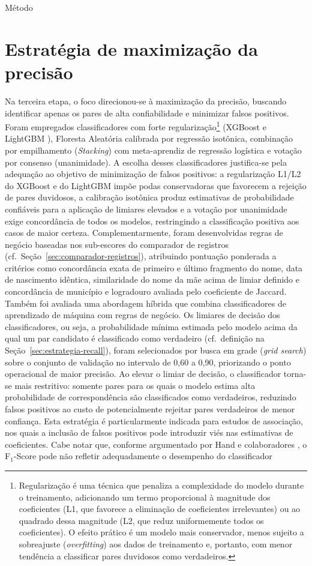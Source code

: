 \begin{chapter}{Método}
\section{Estratégia de maximização da precisão}\label{sec:estrategia-precisao}

Na terceira etapa, o foco direcionou-se à maximização da precisão, buscando identificar apenas os pares de alta confiabilidade e minimizar falsos positivos. Foram empregados classificadores com forte regularização\footnote{Regularização é uma técnica que penaliza a complexidade do modelo durante o treinamento, adicionando um termo proporcional à magnitude dos coeficientes (L1, que favorece a eliminação de coeficientes irrelevantes) ou ao quadrado dessa magnitude (L2, que reduz uniformemente todos os coeficientes). O efeito prático é um modelo mais conservador, menos sujeito a sobreajuste (\textit{overfitting}) aos dados de treinamento e, portanto, com menor tendência a classificar pares duvidosos como verdadeiros.} (XGBoost \cite{Chen2016xgboost} e LightGBM \cite{Ke2017lightgbm}), Floresta Aleatória calibrada por regressão isotônica, combinação por empilhamento (\textit{Stacking}) com meta-aprendiz de regressão logística e votação por consenso (unanimidade). A escolha desses classificadores justifica-se pela adequação ao objetivo de minimização de falsos positivos: a regularização L1/L2 do XGBoost e do LightGBM impõe podas conservadoras que favorecem a rejeição de pares duvidosos, a calibração isotônica produz estimativas de probabilidade confiáveis para a aplicação de limiares elevados e a votação por unanimidade exige concordância de todos os modelos, restringindo a classificação positiva aos casos de maior certeza. Complementarmente, foram desenvolvidas regras de negócio baseadas nos sub-escores do comparador de registros (cf.\ Seção~\ref{sec:comparador-registros}), atribuindo pontuação ponderada a critérios como concordância exata de primeiro e último fragmento do nome, data de nascimento idêntica, similaridade do nome da mãe acima de limiar definido e concordância de município e logradouro avaliada pelo coeficiente de Jaccard. Também foi avaliada uma abordagem híbrida que combina classificadores de aprendizado de máquina com regras de negócio. Os limiares de decisão dos classificadores, ou seja, a probabilidade mínima estimada pelo modelo acima da qual um par candidato é classificado como verdadeiro (cf.\ definição na Seção~\ref{sec:estrategia-recall}), foram selecionados por busca em grade (\textit{grid search}) sobre o conjunto de validação no intervalo de 0{,}60 a 0{,}90, priorizando o ponto operacional de maior precisão. Ao elevar o limiar de decisão, o classificador torna-se mais restritivo: somente pares para os quais o modelo estima alta probabilidade de correspondência são classificados como verdadeiros, reduzindo falsos positivos ao custo de potencialmente rejeitar pares verdadeiros de menor confiança. Esta estratégia é particularmente indicada para estudos de associação, nos quais a inclusão de falsos positivos pode introduzir viés nas estimativas de coeficientes. Cabe notar que, conforme argumentado por Hand e colaboradores \citeyearpar{Hand2018fmeasure}, o F$_1$-Score pode não refletir adequadamente o desempenho do classificador 
\end{chapter}
